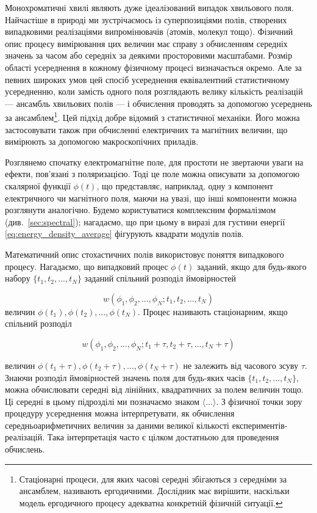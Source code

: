 Монохроматичні хвилі являють дуже ідеалізований випадок хвильового поля. Найчастіше в природі ми зустрічаємось із суперпозиціями полів, створених
випадковими реалізаціями випромінювачів (атомів, молекул тощо). Фізичний опис процесу вимірювання цих величин має справу з обчисленням середніх значень
за часом або середніх за деякими просторовими масштабами. Розмір області усереднення в кожному фізичному процесі визначається окремо. Але за певних
широких умов цей спосіб усереднення еквівалентний статистичному усередненню, коли замість одного поля розглядають велику кількість реалізацій ---
ансамбль хвильових полів --- і обчислення проводять за допомогою усереднень за ансамблем\footnote{Стаціонарні процеси, для яких часові середні
збігаються з середніми за ансамблем, називають ергодичними. Дослідник має вирішити, наскільки модель ергодичного процесу адекватна конкретній фізичній
ситуації.}. Цей підхід добре відомий з статистичної механіки. Його можна застосовувати також при обчисленні електричних та магнітних величин, що
вимірюють за допомогою макроскопічних приладів.

Розглянемо спочатку електромагнітне поле, для простоти не звертаючи уваги на ефекти, пов’язані з поляризацією. Тоді це поле можна описувати за допомогою
скалярної функції \(\phi(t)\), що представляє, наприклад, одну з компонент електричного чи магнітного поля, маючи на увазі, що інші компоненти можна
розглянути аналогічно. Будемо користуватися комплексним формалізмом (див.~\ref{sec:spectral}); нагадаємо, що при цьому в виразі для густини енергії
\eqref{eq:energy_density_average} фігурують квадрати модулів полів.

Математичний опис стохастичних полів використовує поняття випадкового процесу. Нагадаємо, що випадковий процес \(\phi(t)\) заданий, якщо для будь-якого
набору \(\{t_1, t_2, \dots, t_N\}\) заданий спільний розподіл ймовірностей

\begin{equation*}
w(\phi_1, \phi_2, \dots, \phi_N; t_1, t_2, \dots, t_N)
\end{equation*}
величин \(\phi(t_1), \phi(t_2), \dots, \phi(t_N)\). Процес називають стаціонарним, якщо спільний розподіл

\begin{equation*}
w(\phi_1, \phi_2, \dots, \phi_N; t_1 + \tau, t_2 + \tau, \dots, t_N + \tau)
\end{equation*}

величин \(\phi(t_1 + \tau), \phi(t_2 + \tau), \dots, \phi(t_N + \tau)\) не залежить від часового зсуву \(\tau\). Знаючи розподіл ймовірностей значень
поля для будь-яких часів \(\{t_1, t_2, \dots, t_N\}\), можна обчислювати середні від лінійних, квадратичних за полем величин тощо. Ці середні в цьому
підрозділі ми позначаємо знаком \(\langle \dots \rangle\). З фізичної точки зору процедуру усереднення можна інтерпретувати, як обчислення
середньоарифметичних величин за даними великої кількості експериментів-реалізацій. Така інтерпретація часто є цілком достатньою для проведення обчислень.

